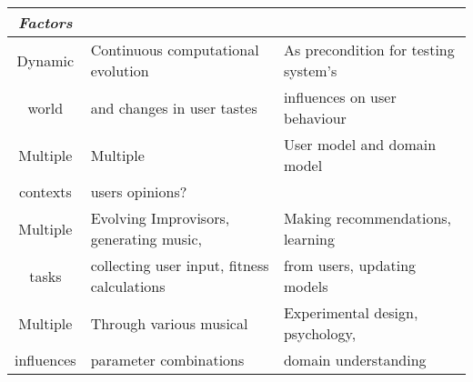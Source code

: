 \begin{table}[ht]
\begin{center}
\begin{tabular}{|c|l|l|}
{\em Factors} && \\
\hline
\hline
Dynamic & Continuous computational evolution& As precondition for testing system's \\
 world & \hspace{3mm}and changes in user tastes & \hspace{3mm} influences on user behaviour\\
\hline
Multiple & Multiple & User model and domain model\\
contexts & \hspace{3mm}users opinions? & \\
\hline
Multiple & Evolving Improvisors, generating music,  & Making recommendations, learning\\
 tasks & \hspace{3mm}collecting user input, fitness calculations& \hspace{3mm}from users, updating models \\
\hline
Multiple & Through various musical& Experimental design, psychology, \\
influences &\hspace{3mm}parameter combinations& \hspace{3mm} domain understanding\\
\hline
\end{tabular}
\end{center}
\label{caseStudies}
\end{table}%
\normalsize
